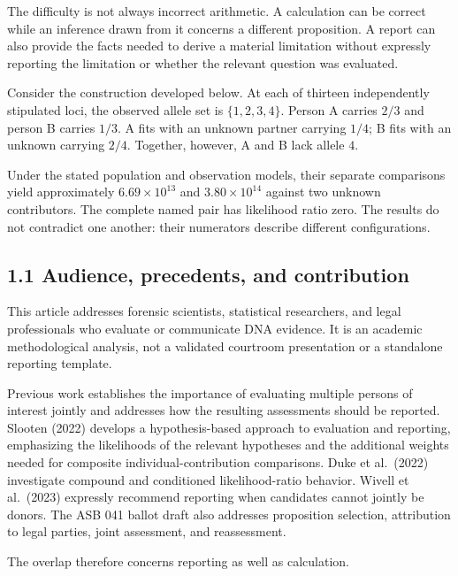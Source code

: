 \documentclass[
]{article}
\begin{document}
The difficulty is not always incorrect arithmetic. A calculation can be
correct while an inference drawn from it concerns a different
proposition. A report can also provide the facts needed to derive a
material limitation without expressly reporting the limitation or
whether the relevant question was evaluated.

Consider the construction developed below. At each of thirteen
independently stipulated loci, the observed allele set is
\(\{1,2,3,4\}\). Person A carries \(2/3\) and person B carries \(1/3\).
A fits with an unknown partner carrying \(1/4\); B fits with an unknown
carrying \(2/4\). Together, however, A and B lack allele \(4\).

Under the stated population and observation models, their separate
comparisons yield approximately \(6.69\times10^{13}\) and
\(3.80\times10^{14}\) against two unknown contributors. The complete
named pair has likelihood ratio zero. The results do not contradict one
another: their numerators describe different configurations.

\subsection{1.1 Audience, precedents, and
contribution}\label{audience-precedents-and-contribution}

This article addresses forensic scientists, statistical researchers, and
legal professionals who evaluate or communicate DNA evidence. It is an
academic methodological analysis, not a validated courtroom presentation
or a standalone reporting template.

Previous work establishes the importance of evaluating multiple persons
of interest jointly and addresses how the resulting assessments should
be reported. Slooten (2022) develops a hypothesis-based approach to
evaluation and reporting, emphasizing the likelihoods of the relevant
hypotheses and the additional weights needed for composite
individual-contribution comparisons. Duke et al.~(2022) investigate
compound and conditioned likelihood-ratio behavior. Wivell et al.~(2023)
expressly recommend reporting when candidates cannot jointly be donors.
The ASB 041 ballot draft also addresses proposition selection,
attribution to legal parties, joint assessment, and reassessment.

The overlap therefore concerns reporting as well as calculation.
\end{document}
